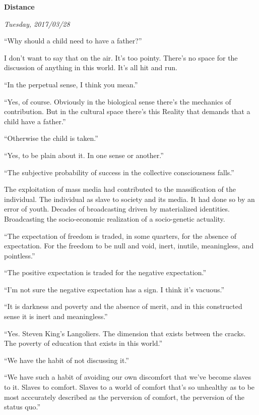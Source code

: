 

\centerline{\bf Distance}
\centerline{\it Tuesday, 2017/03/28}



\vfill
\break

﻿``Why should a child need to have a father?''

I don't want to say that on the air.  It's too pointy.  There's no
space for the discussion of anything in this world.  It's all hit and
run.

``In the perpetual sense, I think you mean.''

``Yes, of course.  Obviously in the biological sense there's the
mechanics of contribution.  But in the cultural space there's this
Reality that demands that a child have a father.''

``Otherwise the child is taken.''

``Yes, to be plain about it.  In one sense or another.''

``The subjective probability of success in the collective
consciousness falls.''

The exploitation of mass media had contributed to the massification of
the individual.  The individual as slave to society and its media.  It
had done so by an error of youth.  Decades of broadcasting driven by
materialized identities.  Broadcasting the socio-economic realization
of a socio-genetic actuality.

\vfill
\break

``The expectation of freedom is traded, in some quarters, for the
absence of expectation.  For the freedom to be null and void, inert,
inutile, meaningless, and pointless.''

``The positive expectation is traded for the negative expectation.''

``I'm not sure the negative expectation has a sign.  I think it's
vacuous.''

``It is darkness and poverty and the absence of merit, and in this
constructed sense it is inert and meaningless.''

``Yes.  Steven King's Langoliers.  The dimension that exists between
the cracks.  The poverty of education that exists in this world.''



\vfill
\break

``We have the habit of not discussing it.''

``We have such a habit of avoiding our own discomfort that we've
become slaves to it.  Slaves to comfort.  Slaves to a world of comfort
that's so unhealthy as to be most acccurately described as the
perversion of comfort, the perversion of the status quo.''

